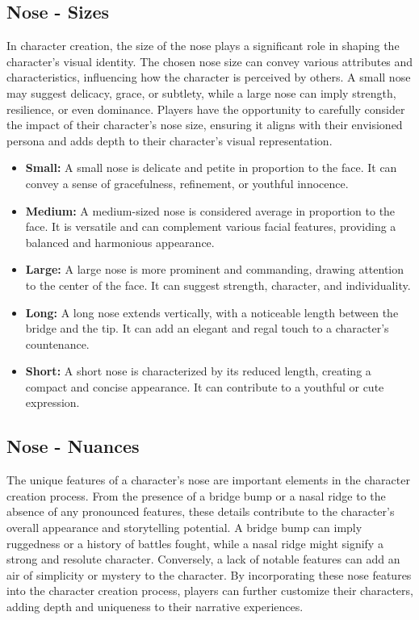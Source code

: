 \documentclass[12pt]{book}  %
\begin{document}
\subsection{\textbf{Nose - Sizes}}

In character creation, the size of the nose plays a significant role in shaping the character's visual identity. The chosen nose size can convey various attributes and characteristics, influencing how the character is perceived by others. A small nose may suggest delicacy, grace, or subtlety, while a large nose can imply strength, resilience, or even dominance. Players have the opportunity to carefully consider the impact of their character's nose size, ensuring it aligns with their envisioned persona and adds depth to their character's visual representation.

\begin{itemize}
    \item \textbf{Small:} A small nose is delicate and petite in proportion to the face. It can convey a sense of gracefulness, refinement, or youthful innocence.
    \item \textbf{Medium:} A medium-sized nose is considered average in proportion to the face. It is versatile and can complement various facial features, providing a balanced and harmonious appearance.
    \item \textbf{Large:} A large nose is more prominent and commanding, drawing attention to the center of the face. It can suggest strength, character, and individuality.
    \item \textbf{Long:} A long nose extends vertically, with a noticeable length between the bridge and the tip. It can add an elegant and regal touch to a character's countenance.
    \item \textbf{Short:} A short nose is characterized by its reduced length, creating a compact and concise appearance. It can contribute to a youthful or cute expression.
\end{itemize}

\subsection{\textbf{Nose - Nuances}}

The unique features of a character's nose are important elements in the character creation process. From the presence of a bridge bump or a nasal ridge to the absence of any pronounced features, these details contribute to the character's overall appearance and storytelling potential. A bridge bump can imply ruggedness or a history of battles fought, while a nasal ridge might signify a strong and resolute character. Conversely, a lack of notable features can add an air of simplicity or mystery to the character. By incorporating these nose features into the character creation process, players can further customize their characters, adding depth and uniqueness to their narrative experiences.
\end{document}
